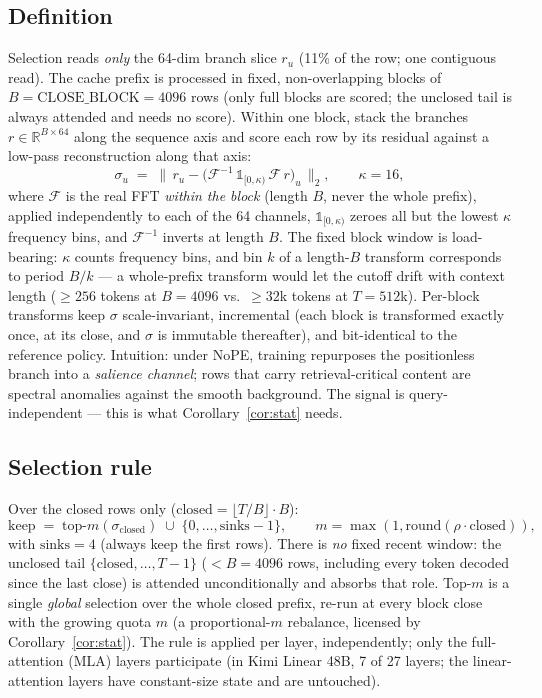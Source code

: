 \documentclass[11pt]{article}
\newcommand{\keep}{\mathrm{keep}}
\begin{document}
\subsection{Definition}
Selection reads \emph{only} the 64-dim branch slice $r_u$ (11\% of the row;
one contiguous read). The cache prefix is processed in fixed, non-overlapping
blocks of $B = \mathrm{CLOSE\_BLOCK} = 4096$ rows (only full blocks are
scored; the unclosed tail is always attended and needs no score). Within one
block, stack the branches $r \in \mathbb{R}^{B\times 64}$ along the sequence
axis and score each row by its residual against a low-pass reconstruction
along that axis:
\begin{equation}\label{eq:sigma}
\sigma_u \;=\; \big\lVert\, r_u - \big(\mathcal{F}^{-1}\,
\mathbb{1}_{[0,\kappa)}\, \mathcal{F}\, r\big)_u \,\big\rVert_2 ,
\qquad \kappa = 16,
\end{equation}
where $\mathcal{F}$ is the real FFT \emph{within the block} (length $B$,
never the whole prefix), applied independently to each of the 64 channels,
$\mathbb{1}_{[0,\kappa)}$ zeroes all but the lowest $\kappa$ frequency bins,
and $\mathcal{F}^{-1}$ inverts at length $B$. The fixed block window is
load-bearing: $\kappa$ counts frequency bins, and bin $k$ of a length-$B$
transform corresponds to period $B/k$ --- a whole-prefix transform would let
the cutoff drift with context length ($\ge 256$ tokens at $B{=}4096$ vs.\
$\ge 32$k tokens at $T{=}512$k). Per-block transforms keep $\sigma$
scale-invariant, incremental (each block is transformed exactly once, at its
close, and $\sigma$ is immutable thereafter), and bit-identical to the
reference policy. Intuition: under NoPE, training repurposes the positionless
branch into a \emph{salience channel}; rows that carry retrieval-critical
content are spectral anomalies against the smooth background. The signal is
query-independent --- this is what Corollary~\ref{cor:stat} needs.

\subsection{Selection rule}
Over the closed rows only ($\mathrm{closed} = \lfloor T / B \rfloor \cdot B$):
\begin{equation}\label{eq:select}
\keep \;=\; \mathrm{top\text{-}}m(\sigma_{\mathrm{closed}})
\;\cup\; \{0,\dots,\text{sinks}-1\},
\qquad m = \max(1, \mathrm{round}(\rho\cdot\mathrm{closed})),
\end{equation}
with $\text{sinks}=4$ (always keep the first rows). There is \emph{no} fixed
recent window: the unclosed tail $\{\mathrm{closed},\dots,T-1\}$
($<B=4096$ rows, including every token decoded since the last close) is
attended unconditionally and absorbs that role. Top-$m$ is a single
\emph{global} selection over the whole closed prefix, re-run at every block
close with the growing quota $m$ (a proportional-$m$ rebalance, licensed by
Corollary~\ref{cor:stat}). The rule is
applied per layer, independently; only the full-attention (MLA) layers
participate (in Kimi Linear 48B, 7 of 27 layers; the linear-attention layers
have constant-size state and are untouched).
\end{document}
